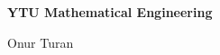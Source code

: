 \documentclass[12pt,a4paper]{book}
\begin{document}
\frontmatter
\begin{titlepage}
    \centering
    {\Huge \textbf{YTU Mathematical Engineering}}\vspace{1.5em}\par
    {\Large Onur Turan}\vspace{1em}\par
\end{titlepage}
\tableofcontents

\mainmatter


\end{document}
